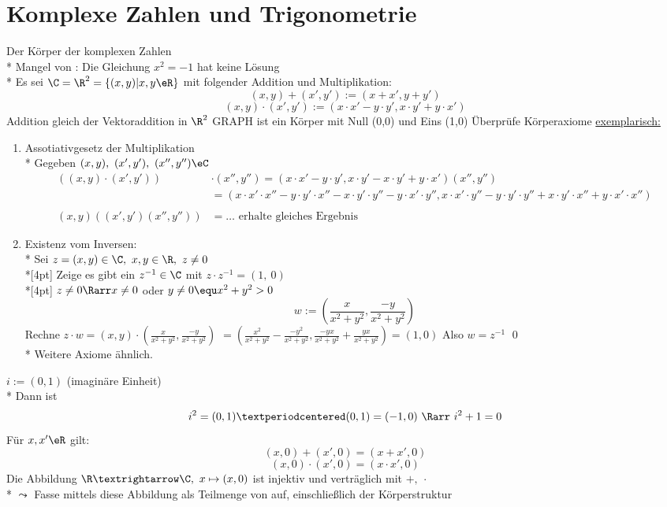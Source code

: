 \chapter{Komplexe Zahlen und Trigonometrie}
Der Körper \C{} der komplexen Zahlen\\*
Mangel von \R{}: Die Gleichung $x^2=-1$ hat keine Lösung\\*
Es sei $\C=\R^2=\{(x,y)|x,y\eR\}$ mit folgender Addition und Multiplikation:
$$(x,y)+(x',y'):=(x+x',y+y')$$
$$(x,y)·(x',y'):=(x·x'-y·y',x·y'+y·x')$$
Addition gleich der Vektoraddition in $\R^2$ GRAPH
\C{} ist ein Körper mit Null (0,0) und Eins (1,0)
\bew
Überprüfe Körperaxiome \ul{exemplarisch:}
\begin{enumerate}
\item{Assotiativgesetz der Multiplikation\\*
Gegeben $(x,y),\ (x',y'),\ (x'',y'')\eC$
\begin{align*}
((x,y)·(x',y'))&·(x'',y'')=(x·x'-y·y',x·y'-x·y'+y·x')(x'',y'')\\
&=(x·x'·x''-y·y'·x''-x·y'·y''-y·x'·y'',x·x'·y''-y·y'·y''+x·y'·x''+y·x'·x'')\\ \\
(x,y)((x',y')(x'',y''))&=…\text{ erhalte gleiches Ergebnis}
\end{align*}}
\item{Existenz vom Inversen:\\*
Sei $z = (x, y) \in \C, \ x, y \in \R, \ z \neq 0$ \\*[4pt]
Zeige es gibt ein $z^{-1} \in \C$ mit $z \cdot z^{-1} = (1,\ 0)$\\*[4pt]
$z \neq 0 \Rarr x \neq 0$ oder $y \neq 0 \equ x^2 + y^2 > 0$
$$w:= \left(\frac{x}{x^2 + y^2}, \frac{-y}{x^2 + y^2}\right)$$
Rechne $z \cdot w = (x, y) \cdot \left(\frac{x}{x^2 + y^2}, \frac{-y}{x^2 + y^2}\right)$
$=\left(\frac{x^2}{x^2 + y^2} - \frac{-y^2}{x^2 + y^2}, \frac{-yx}{x^2 + y^2} + \frac{yx}{x^2 + y^2}\right) = (1, 0)$
Also $w = z^{-1}$ \qed \\*
Weitere Axiome ähnlich.}
\end{enumerate}
$i:=(0,1)$ (imaginäre Einheit)\\*
Dann ist $$i^2=(0,1)·(0,1)=(-1,0)\ \Rarr\ i^2+1=0$$
\bem
Für $x,x'\eR$ gilt:
$$(x,0)+(x',0)=(x+x',0)$$
$$(x,0)·(x',0)=(x·x',0)$$
Die Abbildung $\R→\C,\ x\mapsto(x,0)$ ist injektiv und verträglich mit $+,\ ·$\\*
$\leadsto$ Fasse \R{} mittels diese Abbildung als Teilmenge von \C{} auf, einschließlich der Körperstruktur\\
